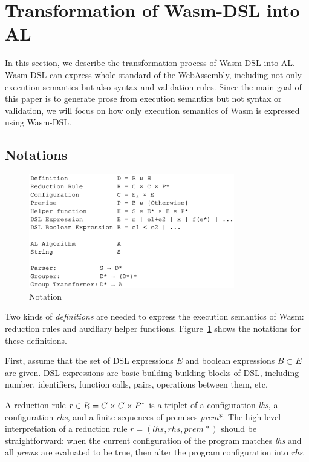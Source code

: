 \section{Transformation of Wasm-DSL into AL}\label{sec:translate}

In this section, we describe the transformation process of Wasm-DSL into AL.
Wasm-DSL can express whole standard of the WebAssembly, including not only
execution semantics but also syntax and validation rules.
Since the main goal of this paper is to generate prose from execution semantics but not syntax or validation,
we will focus on how only execution semantics of Wasm is expressed using Wasm-DSL.

\subsection{Notations}
\begin{figure}
  \centering
  \includegraphics[width=0.8\textwidth]{img/notation.png}
  \caption{Notation}
  \label{fig:notation}
\end{figure}

Two kinds of \textit{definitions} are needed to express the execution semantics of Wasm:
reduction rules and auxiliary helper functions.
Figure~\ref{fig:notation} shows the notations for these definitions.

First, assume that the set of DSL expressions $E$ and boolean expressions $B \subset E$ are given.
DSL expressions are basic building building blocks of DSL, including number, identifiers,
function calls, pairs, operations between them, etc. 

A reduction rule $r \in R = C \times C \times P^\ast$ is a triplet of a
configuration \textit{lhs}, a configuration \textit{rhs}, and a finite sequences of premises \textit{prem}*.
The high-level interpretation of a reduction rule $r = (lhs, rhs, prem*)$ should be straightforward:
when the current configuration of the program matches \textit{lhs} and all \textit{prem}s are
evaluated to be true, then alter the program configuration into \textit{rhs}.


